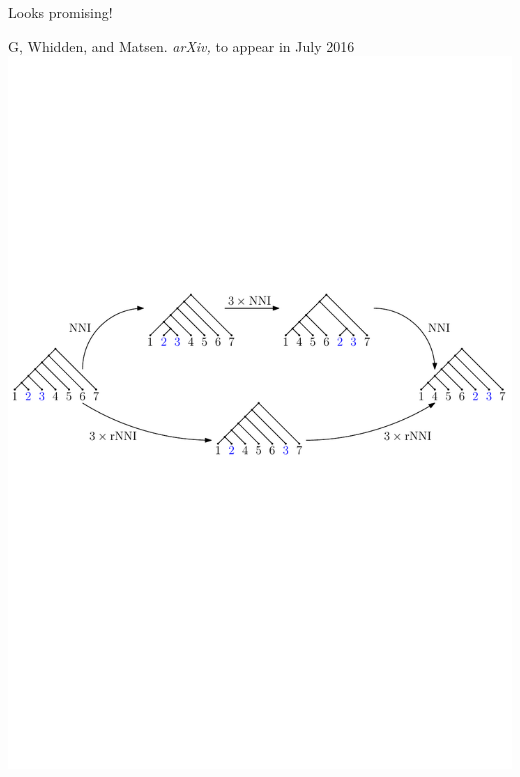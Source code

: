 \documentclass{beamer}
\theoremstyle{example}
\begin{document}
\begin{frame}{Looks promising!}
\begin{block}{G, Whidden, and Matsen. \emph{arXiv,} to appear in July 2016}
\includegraphics[width = \framewidth]{NNI_VS_rNNI}
\end{block}
\end{frame}
\end{document}
